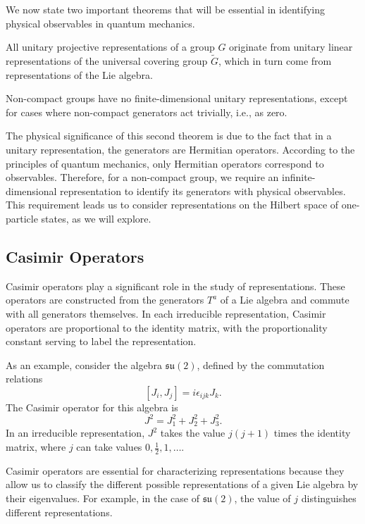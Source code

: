 We now state two important theorems that will be essential in identifying physical observables in quantum mechanics.

\begin{theorem}
All unitary projective representations of a group $G$ originate from unitary linear representations of the universal covering group $\tilde{G}$, which in turn come from representations of the Lie algebra.
\end{theorem}

\begin{theorem}
Non-compact groups have no finite-dimensional unitary representations, except for cases where non-compact generators act trivially, i.e., as zero.
\end{theorem}

\noindent
The physical significance of this second theorem is due to the fact that in a unitary representation, the generators are Hermitian operators. According to the principles of quantum mechanics, only Hermitian operators correspond to observables. Therefore, for a non-compact group, we require an infinite-dimensional representation to identify its generators with physical observables. This requirement leads us to consider representations on the Hilbert space of one-particle states, as we will explore.

\subsection{Casimir Operators}

Casimir operators play a significant role in the study of representations. These operators are constructed from the generators $T^a$ of a Lie algebra and commute with all generators themselves. In each irreducible representation, Casimir operators are proportional to the identity matrix, with the proportionality constant serving to label the representation.

As an example, consider the algebra $\mathfrak{su}(2)$, defined by the commutation relations
\[
[J_i, J_j] = i \epsilon_{ijk} J_k.
\]
The Casimir operator for this algebra is
\[
J^2 = J_1^2 + J_2^2 + J_3^2.
\]
In an irreducible representation, $J^2$ takes the value $j(j + 1)$ times the identity matrix, where $j$ can take values $0, \frac{1}{2}, 1, \dots$.

Casimir operators are essential for characterizing representations because they allow us to classify the different possible representations of a given Lie algebra by their eigenvalues. For example, in the case of $\mathfrak{su}(2)$, the value of $j$ distinguishes different representations. 

